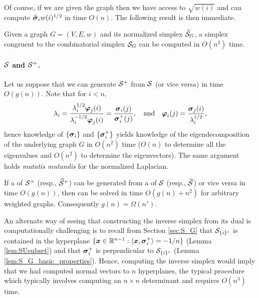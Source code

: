 Of course, if we are given the graph then we have access to $\sqrt{w(i)}$ and can compute $\widehat{\vb*{\sigma}}_i w(i)^{1/2}$ in time $O(n)$. The following result is then immediate. 

\begin{lemma}
	Given a graph $G=(V,E,w)$ and its normalized simplex $\widehat{\mathcal{S}}_G$, a simplex congruent to  the combinatorial simplex $\mathcal{S}_G$ can be computed in $O(n^2)$ time. 
\end{lemma}




\paragraph{\texorpdfstring{$\mathcal{S}$}{The combinatorial} and \texorpdfstring{$\mathcal{S}^+$}{normalized simplex}.}

Let us suppose that we can generate $\mathcal{S}^+$ from $\mathcal{S}$ (or vice versa) in time $O(g(n))$. Note that for $i<n$, 
\begin{equation}
\label{eq:decomp_from_vertices}
\lambda_i = \frac{\lambda_i^{1/2} \vb*{\varphi}_j(i)}{\lambda_i^{-1/2}\vb*{\varphi}_j(i)} = \frac{\vb*{\sigma}_i(j)}{\vb*{\sigma}_i^+(j)}, \quad \text{and} \quad \vb*{\varphi}_i(j) = \frac{\vb*{\sigma}_j(i)}{\lambda_i^{1/2}},
\end{equation}
hence knowledge of $\{\vb*{\sigma}_i\}$ and $\{\vb*{\sigma}_i^+\}$ yields knowledge of the eigendecomposition of the underlying graph $G$ in $O(n^2)$ time ($O(n)$ to determine all the  eigenvalues and $O(n^2)$ to determine the eigenvectors). The same argument holds \emph{mutatis mutandis} for the normalized Laplacian. 

\begin{lemma}
	\label{lem:S_to_S^+_vdesc}
	If a \vdesc of $\mathcal{S}^+$  (resp., $\widehat{\mathcal{S}}^+$) can be generated from a \vdesc of $\mathcal{S}$ (resp., $\widehat{\mathcal{S}}$) or vice versa in time $O(g(n))$, then \lapdecomp can be solved in time $O(g(n) + n^2)$ for arbitrary weighted graphs. Consequently $g(n) = \Omega(n^\tau)$.  
\end{lemma}

An alternate way of seeing that constructing the inverse simplex from its dual is computationally challenging is to recall from Section \ref{sec:S_G} that $\mathcal{S}_{\{i\}^c}$ is contained in the hyperplane $\{\vb*{x}\in\mathbb{R}^{n-1}:\langle \vb*{x},\vb*{\sigma}_i^+\rangle = -1/n\}$ (Lemma \ref{lem:SUsubset})
 and that $\vb*{\sigma}_i^+$ is perpendicular to $\mathcal{S}_{\{i\}^c}$ (Lemma \ref{lem:S_G_basic_properties}). Hence, computing the inverse simplex would imply that we had computed normal vectors to $n$ hyperplanes, the typical procedure which typically involves computing an $n\times n$ determinant and requires  $O(n^3)$ time. 
 
